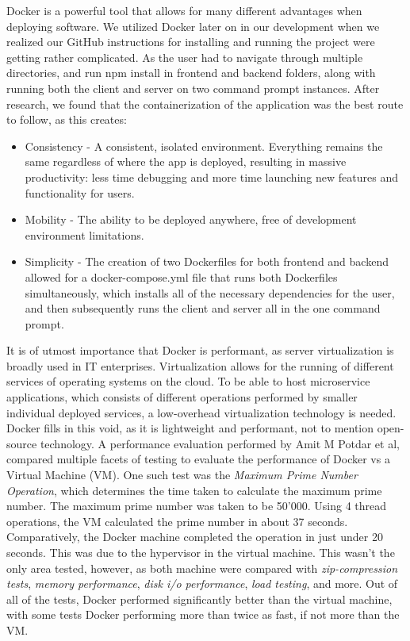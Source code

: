 Docker is a powerful tool that allows for many different advantages when deploying software. We utilized Docker later on in our development when we realized our GitHub instructions for installing and running the project were getting rather complicated. As the user had to navigate through multiple directories, and run npm install in frontend and backend folders, along with running both the client and server on two command prompt instances. After research, we found that the containerization of the application was the best route to follow, as this creates:
\begin{itemize}
    \item Consistency - A consistent, isolated environment. Everything remains the same regardless of where the app is deployed, resulting in massive productivity: less time debugging and more time launching new features and functionality for users.
    \item Mobility - The ability to be deployed anywhere, free of development environment limitations. \item Simplicity - The creation of two Dockerfiles for both frontend and backend allowed for a docker-compose.yml file that runs both Dockerfiles simultaneously, which installs all of the necessary dependencies for the user, and then subsequently runs the client and server all in the one command prompt.
\end{itemize}

It is of utmost importance that Docker is performant, as server virtualization is broadly used in IT enterprises. Virtualization allows for the running of different services of operating systems on the cloud. To be able to host microservice applications, which consists of different operations performed by smaller individual deployed services, a low-overhead virtualization technology is needed. Docker fills in this void, as it is lightweight and performant, not to mention open-source technology. A performance evaluation performed by Amit M Potdar et al, compared multiple facets of testing to evaluate the performance of Docker vs a Virtual Machine (VM). One such test was the \textit{Maximum Prime Number Operation}, which determines the time taken to calculate the maximum prime number. The maximum prime number was taken to be 50'000. Using 4 thread operations, the VM calculated the prime number in about 37 seconds. Comparatively, the Docker machine completed the operation in just under 20 seconds. This was due to the hypervisor in the virtual machine. This wasn't the only area tested, however, as both machine were compared with \textit{zip-compression tests}, \textit{memory performance}, \textit{disk i/o performance}, \textit{load testing}, and more. Out of all of the tests, Docker performed significantly better than the virtual machine, with some tests Docker performing more than twice as fast, if not more than the VM\cite{POTDAR20201419}.

